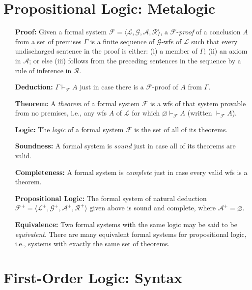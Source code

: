 \documentclass[a4paper, 11pt]{article} %
\newcommand{\tuple}[1]{\langle#1\rangle} %
\renewcommand{\L}[0]{\mathcal{L}}
\begin{document}
\section*{\sc Propositional Logic: Metalogic}

\begin{enumerate}[leftmargin=1.2in,labelsep=.15in] 
\item[\bf Proof:] Given a formal system $\mathcal{F}=\tuple{\L,\mathcal{G},\mathcal{A},\mathcal{R}}$, a $\mathcal{F}$-\textit{proof} of a conclusion $A$ from a set of premises $\Gamma$ is a finite sequence of $\mathcal{G}$-wfs of $\L$ such that every undischarged sentence in the proof is either: (i) a member of $\Gamma$; (ii) an axiom in $\mathcal{A}$; or else (iii) follows from the preceding sentences in the sequence by a rule of inference in $\mathcal{R}$.
\item[\bf Deduction:] $\Gamma\vdash_{\mathcal{F}} A$ just in case there is a $\mathcal{F}$-proof of $A$ from $\Gamma$.
\item[\bf Theorem:] A \textit{theorem} of a formal system $\mathcal{F}$ is a wfs of that system provable from no premises, i.e., any wfs $A$ of $\L$ for which $\varnothing\vdash_{\mathcal{F}}A$ (written $\vdash_{\mathcal{F}}A$).
\item[\bf Logic:] The \textit{logic} of a formal system $\mathcal{F}$ is the set of all of its theorems.
\item[\bf Soundness:] A formal system is \textit{sound} just in case all of its theorems are valid.
\item[\bf Completeness:] A formal system is \textit{complete} just in case every valid wfs is a theorem.
\item[\bf Propositional Logic:] The formal system of natural deduction $\mathcal{F}^+=\tuple{\L^+,\mathcal{G}^+,\mathcal{A}^+,\mathcal{R}^+}$ given above is sound and complete, where $\mathcal{A}^+=\varnothing$. 
\item[\bf Equivalence:] Two formal systems with the same logic may be said to be \textit{equivalent}. There are many equivalent formal systems for propositional logic, i.e., systems with exactly the same set of theorems.
\end{enumerate}




\section*{\sc First-Order Logic: Syntax}
\end{document}

